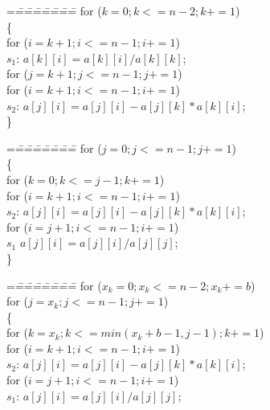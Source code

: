 
\begin {figure*}
\beginfig
{\footnotesize %
\begin {minipage}{.2\textwidth}
\begin {tabbing}
=\==\==\==\==\==\==\==\kill
\> for ($k = 0; k <= n - 2; k+=1$) \\
\> \{ \\
\>\>  for ($i = k + 1; i <= n-1; i+=1$) \\
$s_1$:\>\>\>   $a[k][i] = a[k][i] / a[k][k]$; \\
\>\>   for ($j = k+1; j <= n-1; j+=1$) \\
\>\>\>     for ($i = k + 1; i <= n-1; i+=1$) \\
$s_2$:\>\>\>\>    $a[j][i] = a[j][i] - a[j][k] * a[k][i]$; \\
\> \}
\end {tabbing}
\end {minipage}
\begin {minipage}{.2\textwidth}
\begin {tabbing}
=\==\==\==\==\==\==\==\kill
\>  for ($j = 0; j <= n-1; j += 1$)  \\
\> \{ \\
\>\>  for ($k = 0; k <= j-1; k += 1$) \\
\>\>\>  for ($i = k+1; i <= n-1; i += 1$) \\
$s_2$:\>\>\>\>   $a[j][i] = a[j][i] - a[j][k] * a[k][i]$; \\
\>\>  for ($i = j+1; i <= n-1; i += 1$) \\
$s_1$\>\>\>     $a[j][i] = a[j][i] / a[j][j]$; \\
\> \}
\end {tabbing}
\end {minipage}
\begin {minipage}{.2\textwidth}
\begin {tabbing}
=\==\==\==\==\==\==\==\kill
\> for ($x_k = 0; x_k <= n-2; x_k += b$) \\
\>\>  for ($j = x_k; j <= n-1; j += 1$) \\
\>\> \{ \\
\>\>\>  for ($k = x_k; k <= min(x_k+b-1,j-1); k += 1$) \\
\>\>\>\>  for ($i = k+1; i <= n-1; i += 1$) \\
$s_2$:\>\>\>\>\>   $a[j][i] = a[j][i] - a[j][k] * a[k][i]$; \\
\>\>\>  for ($i = j+1; i <= n-1; i += 1$) \\
$s_1$:\>\>\>\>     $a[j][i] = a[j][i] / a[j][j]$; \\

\end{tabbing}
\end{minipage}}
\end{figure*}

